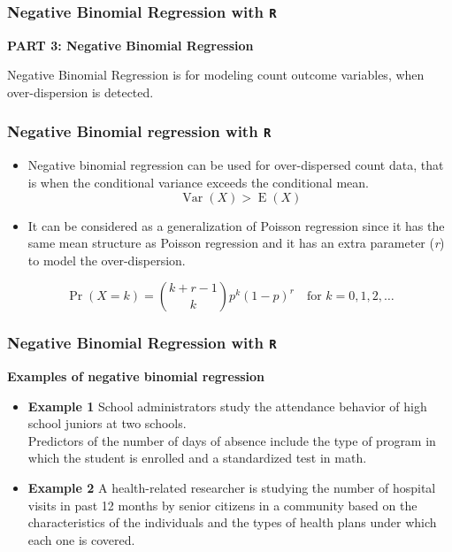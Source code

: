 \documentclass[MASTER.tex]{subfiles}
\begin{document}
\begin{frame}[fragile]
\frametitle{Negative Binomial Regression with \texttt{R}}
\Large
\textbf{PART 3: Negative Binomial Regression}

\bigskip
{
\Large
Negative Binomial Regression is for modeling count outcome variables, when over-dispersion is detected.
}
\end{frame}
\begin{frame}[fragile]
\frametitle{Negative Binomial regression with \texttt{R}}
\large	
\begin{itemize}
		\item Negative binomial regression can be used for over-dispersed count data, that is when the conditional 
		variance exceeds the conditional mean. 
		\[\operatorname{Var}(X) >  \operatorname{E}(X)\]
		\item It can be considered as a generalization of Poisson regression since it has the same mean structure as Poisson 	
		regression and it has an extra parameter (\textit{r}) to model the over-dispersion. 
\end{itemize}
\[\Pr(X = k) = {k+r-1 \choose k} p^k(1-p)^r \quad \mbox{for }k = 0, 1, 2, \dots \]
	
\end{frame}
\begin{frame}[fragile]
\frametitle{Negative Binomial Regression with \texttt{R} }
\large
\textbf{Examples of negative binomial regression}
\begin{itemize}
\item \textbf{Example 1}  School administrators study the attendance behavior of high school juniors at two schools. \\ Predictors of the number of days of absence include the type of program in which the student is enrolled and a standardized test in math.

\item \textbf{Example 2}  A health-related researcher is studying the number of hospital visits in past 12 months by senior citizens in a community based on the characteristics of the individuals and the types of health plans under which each one is covered.
\end{itemize}
\end{frame}
\end{document}
